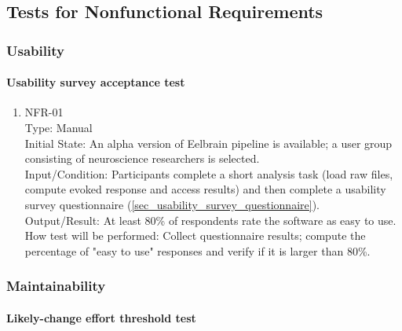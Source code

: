 \documentclass[12pt, titlepage]{article}
\begin{document}
\subsection{Tests for Nonfunctional Requirements}





\subsubsection{Usability}


\paragraph{Usability survey acceptance test}


\begin{enumerate}


\item{NFR-01\\}
    Type: Manual \\
    Initial State: An alpha version of Eelbrain pipeline is available; a user group consisting of neuroscience researchers is selected. \\
    Input/Condition: Participants complete a short analysis task (load raw files, compute evoked response and access results) and then complete a usability survey questionnaire (\ref{sec_usability_survey_questionnaire}). \\
    Output/Result: At least 80\% of respondents rate the software as easy to use. \\
    How test will be performed: Collect questionnaire results; compute the percentage of "easy to use" responses and verify if it is larger than 80\%.


\end{enumerate}




\subsubsection{Maintainability}


\paragraph{Likely-change effort threshold test}
\end{document}
